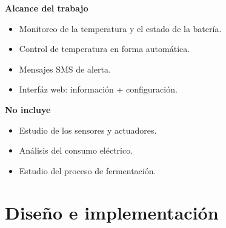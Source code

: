 \documentclass[11pt]{beamer}
\begin{document}
\begin{frame}{\textbf{\LARGE{Alcance del trabajo}}}
  \fontsize{18pt}{18}\selectfont
  \begin{minipage}[c]{1.0\linewidth}
    \centering
      \begin{itemize}
        \item Monitoreo de la temperatura y el estado de la batería.
          \vspace{10px}
        \item Control de temperatura en forma automática.
          \vspace{10px}      	
        \item Mensajes SMS de alerta.
          \vspace{10px}
        \item Interfáz web: información + configuración.
          \vspace{10px}
      \end{itemize}
  \end{minipage}
\end{frame}


\begin{frame}{\textbf{\LARGE{No incluye}}}
  \fontsize{18pt}{18}\selectfont
  \begin{minipage}[c]{1.0\linewidth}
    \centering
      \begin{itemize}
        \item Estudio de los sensores y actuadores.
          \vspace{10px}
        \item Análisis del consumo eléctrico.
          \vspace{10px}
        \item Estudio del proceso de fermentación.
          \vspace{10px}
      \end{itemize}
  \end{minipage}
\end{frame}


\section{Diseño e implementación}
\end{document}
